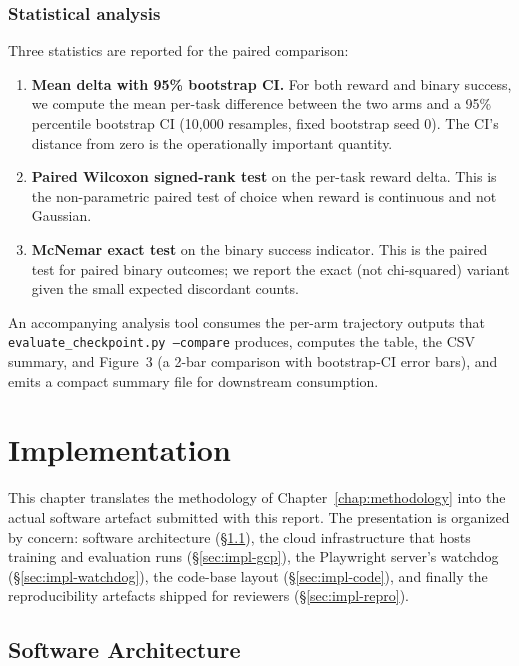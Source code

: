 \documentclass[12pt,a4paper]{report}
\begin{document}
\subsection*{Statistical analysis}

Three statistics are reported for the paired comparison:
\begin{enumerate}
  \item \textbf{Mean delta with 95\% bootstrap CI.} For both reward and binary success, we compute the mean per-task difference between the two arms and a 95\% percentile bootstrap CI (10{,}000 resamples, fixed bootstrap seed 0). The CI's distance from zero is the operationally important quantity.
  \item \textbf{Paired Wilcoxon signed-rank test} on the per-task reward delta. This is the non-parametric paired test of choice when reward is continuous and not Gaussian.
  \item \textbf{McNemar exact test} on the binary success indicator. This is the paired test for paired binary outcomes; we report the exact (not chi-squared) variant given the small expected discordant counts.
\end{enumerate}

An accompanying analysis tool consumes the per-arm trajectory outputs that \texttt{evaluate\_checkpoint.py --compare} produces, computes the table, the CSV summary, and Figure~3 (a 2-bar comparison with bootstrap-CI error bars), and emits a compact summary file for downstream consumption.

\chapter{Implementation}\label{chap:implementation}

This chapter translates the methodology of Chapter~\ref{chap:methodology} into the actual software artefact submitted with this report. The presentation is organized by concern: software architecture (\S\ref{sec:impl-arch}), the cloud infrastructure that hosts training and evaluation runs (\S\ref{sec:impl-gcp}), the Playwright server's watchdog (\S\ref{sec:impl-watchdog}), the code-base layout (\S\ref{sec:impl-code}), and finally the reproducibility artefacts shipped for reviewers (\S\ref{sec:impl-repro}).

\section{Software Architecture}\label{sec:impl-arch}
\end{document}
